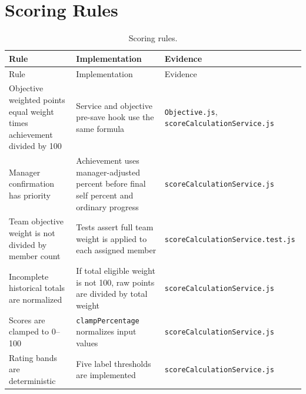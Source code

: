 \section{Scoring Rules}
\begin{longtable}{p{}p{}p{}}
\caption{Scoring rules.}\label{tab:scoring-rules}\\
\toprule
Rule & Implementation & Evidence\\
\midrule
\endfirsthead
\toprule
Rule & Implementation & Evidence\\
\midrule
\endhead
Objective weighted points equal weight times achievement divided by 100 & Service and objective pre-save hook use the same formula & \texttt{Objective.js}, \texttt{scoreCalculationService.js}\\
Manager confirmation has priority & Achievement uses manager-adjusted percent before final self percent and ordinary progress & \texttt{scoreCalculationService.js}\\
Team objective weight is not divided by member count & Tests assert full team weight is applied to each assigned member & \texttt{scoreCalculationService.test.js}\\
Incomplete historical totals are normalized & If total eligible weight is not 100, raw points are divided by total weight & \texttt{scoreCalculationService.js}\\
Scores are clamped to 0--100 & \texttt{clampPercentage} normalizes input values & \texttt{scoreCalculationService.js}\\
Rating bands are deterministic & Five label thresholds are implemented & \texttt{scoreCalculationService.js}\\
\bottomrule
\end{longtable}

